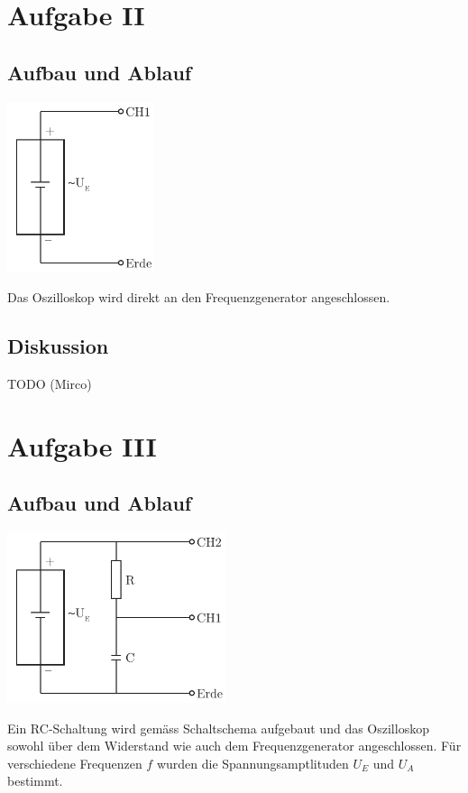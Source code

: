 \documentclass[12pt,a4paper]{article}
\begin{document}
\section*{Aufgabe II}
\subsection*{Aufbau und Ablauf}
\includegraphics[height=5cm]{illustration2.pdf}

Das Oszilloskop wird direkt an den Frequenzgenerator angeschlossen.

\subsection*{Diskussion}
TODO (Mirco)


\section*{Aufgabe III}
\subsection*{Aufbau und Ablauf}
\includegraphics[height=5cm]{illustration3.pdf}

\noindent
Ein RC-Schaltung wird gem\"ass Schaltschema aufgebaut und das Oszilloskop sowohl \"uber dem Widerstand wie auch dem Frequenzgenerator angeschlossen. F\"ur verschiedene Frequenzen $f$ wurden die Spannungsamptlituden $U_E$ und $U_A$ bestimmt.
\end{document}
